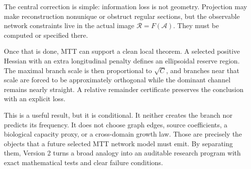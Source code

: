 \documentclass[11pt]{article}
\newcommand{\Adm}{\mathcal A}
\newcommand{\Image}{\mathcal R}
\begin{document}
The central correction is simple: information loss is not geometry.
Projection may make reconstruction nonunique or obstruct regular sections,
but the observable network constraints live in the actual image
$\Image=F(\Adm)$.  They must be computed or specified there.

Once that is done, MTT can support a clean local theorem.  A selected
positive Hessian with an extra longitudinal penalty defines an ellipsoidal
reserve region.  The maximal branch scale is then proportional to
$\sqrt C$, and branches near that scale are forced to be approximately
orthogonal while the dominant channel remains nearly straight.  A relative
remainder certificate preserves the conclusion with an explicit loss.

This is a useful result, but it is conditional.  It neither creates the
branch nor predicts its frequency.  It does not choose graph edges, source
coefficients, a biological capacity proxy, or a cross-domain growth law.
Those are precisely the objects that a future selected MTT network model
must emit.  By separating them, Version 2 turns a broad analogy into an
auditable research program with exact mathematical tests and clear failure
conditions.



\end{document}
